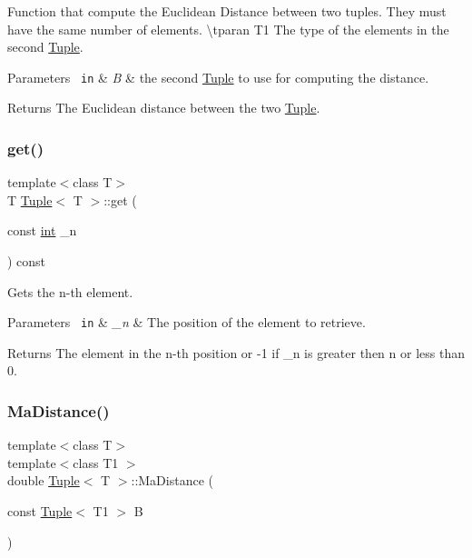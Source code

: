 Function that compute the Euclidean Distance between two tuples. They must have the same number of elements. \textbackslash{}tparan T1 The type of the elements in the second \mbox{\hyperlink{class_tuple}{Tuple}}. 


\begin{DoxyParams}[1]{Parameters}
\mbox{\texttt{ in}}  & {\em B} & the second \mbox{\hyperlink{class_tuple}{Tuple}} to use for computing the distance. \\
\hline
\end{DoxyParams}
\begin{DoxyReturn}{Returns}
The Euclidean distance between the two \mbox{\hyperlink{class_tuple}{Tuple}}. 
\end{DoxyReturn}
\mbox{\label{class_tuple_aabf82c5d0f19c9a8f6a8f01d95801162}} 
\subsubsection{\texorpdfstring{get()}{get()}}
{\footnotesize\ttfamily template$<$class T$>$ \\
T \mbox{\hyperlink{class_tuple}{Tuple}}$<$ T $>$\+::get (\begin{DoxyParamCaption}\item[{const \mbox{\hyperlink{draw_8hh_aa620a13339ac3a1177c86edc549fda9b}{int}}}]{\+\_\+n }\end{DoxyParamCaption}) const\hspace{0.3cm}{\ttfamily [inline]}}



Gets the n-\/th element. 


\begin{DoxyParams}[1]{Parameters}
\mbox{\texttt{ in}}  & {\em \+\_\+n} & The position of the element to retrieve. \\
\hline
\end{DoxyParams}
\begin{DoxyReturn}{Returns}
The element in the n-\/th position or -\/1 if \+\_\+n is greater then n or less than 0. 
\end{DoxyReturn}
\mbox{\label{class_tuple_ac668269743d9be71769c9b4a424c785f}} 
\subsubsection{\texorpdfstring{MaDistance()}{MaDistance()}}
{\footnotesize\ttfamily template$<$class T$>$ \\
template$<$class T1 $>$ \\
double \mbox{\hyperlink{class_tuple}{Tuple}}$<$ T $>$\+::Ma\+Distance (\begin{DoxyParamCaption}\item[{const \mbox{\hyperlink{class_tuple}{Tuple}}$<$ T1 $>$}]{B }\end{DoxyParamCaption})\hspace{0.3cm}{\ttfamily [inline]}}



